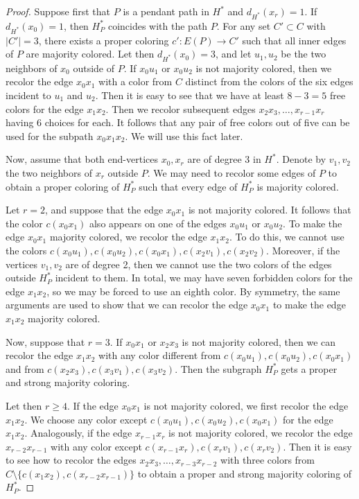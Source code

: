 \documentclass[10pt,a4paper]{amsart}
\begin{document}
\begin{proof}
Suppose first that $P$ is a pendant path in $H^*$ and $d_{H^*}(x_r)=1$. If $d_{H^*}(x_0)=1$, then $H^*_P$ coincides with the path $P$. For any set $C'\subset C$ with $|C'|=3$, there exists a proper coloring $c':E(P)\rightarrow C'$ such that all  inner edges of $P$ are majority colored. 
Let then $d_{H^*}(x_0)=3$, and let $u_1,u_2$ be the two neighbors of $x_0$ outside of $P$. If $x_0u_1$ or $x_0u_2$ is not majority colored, then we recolor the edge $x_0x_1$ with a color from $C$ distinct from the colors of the six edges incident to $u_1$ and $u_2$. Then it is easy to see that we have at least $8-3=5$ free colors for the edge $x_1x_2$. Then we recolor subsequent edges $x_2x_3,\ldots, x_{r-1}x_r$ having 6 choices for each. It follows that any pair of free colors out of five can be used for the subpath $x_0x_1x_2$. We will use this fact later.

Now, assume that both end-vertices $x_0,x_r$ are of degree 3 in $H^*$. Denote by $v_1,v_2$ the two neighbors of $x_r$ outside $P$. We may need to recolor some edges of $P$ to obtain a proper coloring of $H^*_P$
such that every edge of $H^*_P$ is majority colored. 

Let $r=2$, and suppose that the edge $x_0x_1$ is not majority colored. It follows that the color $c(x_0x_1)$ also appears on one of the edges $x_0u_1$ or $x_0u_2$. To make the edge $x_0x_1$ majority colored, we recolor the edge $x_1x_2$. To do this, we cannot use the colors $c(x_0u_1), c(x_0u_2), c(x_0x_1),c(x_2v_1), c(x_2v_2)$. Moreover, if the vertices $v_1,v_2$ are of degree 2, then we cannot use the two colors of the edges outside $H^*_P$ incident to them. In total, we may have seven forbidden colors for the edge $x_1x_2$, so we may be forced to use an eighth color. By symmetry, the same arguments are used to show that we can recolor the edge $x_0x_1$ to make the edge $x_1x_2$ majority colored. 

Now, suppose that $r= 3$. If  $x_0x_1$ or $x_2x_3$ is not majority colored, then we can recolor the edge $x_1x_2$ with any color different from $c(x_0u_1), c(x_0u_2), c(x_0x_1)$ and from $c(x_2x_3),c(x_3v_1),c(x_3v_2)$. Then the subgraph $H^*_P$ gets a proper and strong majority coloring.  

Let then $r\ge 4$. If the edge $x_0x_1$ is not majority colored, we first recolor the edge $x_1x_2$. We choose  any color except $c(x_0u_1), c(x_0u_2), c(x_0x_1)$ for the edge $x_1x_2$. Analogously, if the edge $x_{r-1}x_r$ is not majority colored, we recolor the edge $x_{r-2}x_{r-1}$ with any color except  $c(x_{r-1}x_r),c(x_rv_1), c(x_rv_2)$. Then it is easy to see how to recolor the edges $x_2x_3,\ldots,x_{r-3}x_{r-2}$ with three colors from $C\setminus\{c(x_1x_2),c(x_{r-2}x_{r-1})\}$ to obtain a proper and strong majority coloring of $H^*_P$. 


\end{proof}
\end{document}

